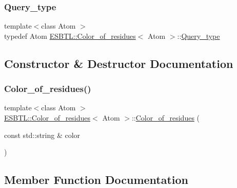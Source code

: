 \subsubsection{\texorpdfstring{Query\+\_\+type}{Query\_type}}
{\footnotesize\ttfamily template$<$class Atom $>$ \\
typedef Atom \hyperlink{classESBTL_1_1Color__of__residues}{E\+S\+B\+T\+L\+::\+Color\+\_\+of\+\_\+residues}$<$ Atom $>$\+::\hyperlink{classESBTL_1_1Color__of__residues_a330e9e55bf0f4610807939a480d0024e}{Query\+\_\+type}}



\subsection{Constructor \& Destructor Documentation}
\mbox{\label{classESBTL_1_1Color__of__residues_acaab1ef7aaa341b11c9efbb201c3e608}} 
\subsubsection{\texorpdfstring{Color\+\_\+of\+\_\+residues()}{Color\_of\_residues()}}
{\footnotesize\ttfamily template$<$class Atom $>$ \\
\hyperlink{classESBTL_1_1Color__of__residues}{E\+S\+B\+T\+L\+::\+Color\+\_\+of\+\_\+residues}$<$ Atom $>$\+::\hyperlink{classESBTL_1_1Color__of__residues}{Color\+\_\+of\+\_\+residues} (\begin{DoxyParamCaption}\item[{const std\+::string \&}]{color }\end{DoxyParamCaption})\hspace{0.3cm}{\ttfamily [inline]}}



\subsection{Member Function Documentation}
\mbox{\label{classESBTL_1_1Color__of__residues_adff9a62be71f9c64cad94e2fff261523}} 
